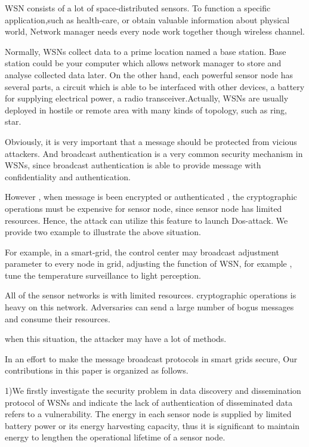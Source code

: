 \documentclass[lnicst,sechang,a4paper]{svmultln}
\begin{document}
	
	WSN consists of a lot of space-distributed sensors. To function a specific application,such as health-care, or obtain valuable information about physical world, Network manager needs every node work together though wireless channel.

Normally, WSNs collect data to a prime location named a base station. Base station could be your computer which allows network manager to store and analyse collected data later. On the other hand, each powerful sensor node has several parts, a circuit which is able to be interfaced with other devices, a battery for supplying electrical power, a radio transceiver.Actually, WSNs are usually deployed in hostile or remote area with many kinds of topology, such as ring, star. 

Obviously, it is very important that a message should be protected from vicious attackers. And broadcast authentication is a very common security mechanism in WSNs, since broadcast authentication is able to provide message with confidentiality and authentication. 

However , when message is been encrypted or authenticated , the cryptographic operations must be expensive for sensor node, since sensor node has limited  resources.  Hence, the attack can utilize this feature to launch Dos-attack.
We provide two example to illustrate the above situation.

For example, in a smart-grid, the control center may broadcast adjustment parameter to every node in grid, adjusting the function of WSN, for example , tune the temperature surveillance to light perception. 

All of the sensor networks is with limited resources. cryptographic operations is heavy on this network. Adversaries can send a large number of bogus messages and consume their resources.

when this situation, the attacker may have a lot of methods.

In an effort to make the message broadcast protocols in smart grids secure, Our contributions in this paper is organized as follows.

1)We firstly investigate the security problem in data discovery and dissemination protocol of WSNs and indicate the lack of authentication of disseminated data refers to a vulnerability. The energy in each sensor node is supplied by limited battery power or its energy harvesting capacity, thus it is significant to maintain energy to lengthen the operational lifetime of a sensor node.
\end{document}
